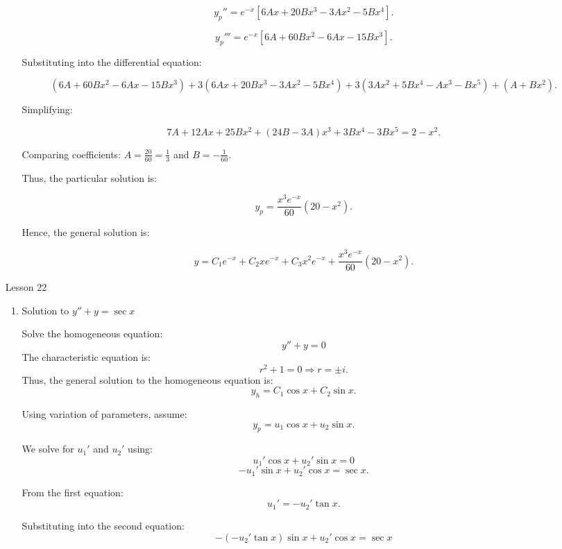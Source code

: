 \documentclass[12pt]{article}
\begin{document}
\begin{enumerate}
\begin{enumerate}
    \[
    y_p'' = e^{-x} \left[ 6Ax + 20Bx^3 - 3Ax^2 - 5Bx^4 \right].
    \]

    \[
    y_p''' = e^{-x} \left[ 6A + 60Bx^2 - 6Ax - 15Bx^3 \right].
    \]

    Substituting into the differential equation:

    \[
    (6A + 60Bx^2 - 6Ax - 15Bx^3) + 3(6Ax + 20Bx^3 - 3Ax^2 - 5Bx^4) + 3(3Ax^2 + 5Bx^4 - Ax^3 - Bx^5) + (A + Bx^2).
    \]

    Simplifying:

    \[
    7A + 12Ax + 25Bx^2 + (24B - 3A)x^3 + 3Bx^4 - 3Bx^5 = 2 - x^2.
    \]

    Comparing coefficients:
 \( A = \frac{20}{60} = \frac{1}{3} \) and \( B = -\frac{1}{60} \).

    Thus, the particular solution is:

    \[
    y_p = \frac{x^3 e^{-x}}{60} (20 - x^2).
    \]

    Hence, the general solution is:

    \[
    y = C_1 e^{-x} + C_2 x e^{-x} + C_3 x^2 e^{-x} + \frac{x^3 e^{-x}}{60} (20 - x^2).
    \]

\end{enumerate}

\item [Lesson 22]
\begin{enumerate}

    \item Solution to \( y'' + y = \sec x \)
    
        Solve the homogeneous equation:
        \[
        y'' + y = 0
        \]
        The characteristic equation is:
        \[
        r^2 + 1 = 0 \Rightarrow r = \pm i.
        \]
        Thus, the general solution to the homogeneous equation is:
        \[
        y_h = C_1 \cos x + C_2 \sin x.
        \]

        Using variation of parameters, assume:
        \[
        y_p = u_1 \cos x + u_2 \sin x.
        \]

        We solve for \( u_1' \) and \( u_2' \) using:
        \[
        u_1' \cos x + u_2' \sin x = 0
        \]
        \[
        - u_1' \sin x + u_2' \cos x = \sec x.
        \]

        From the first equation:
        \[
        u_1' = -u_2' \tan x.
        \]

        Substituting into the second equation:
        \[
        -(-u_2' \tan x) \sin x + u_2' \cos x = \sec x
        \]


\end{enumerate}
\end{enumerate}
\end{document}
